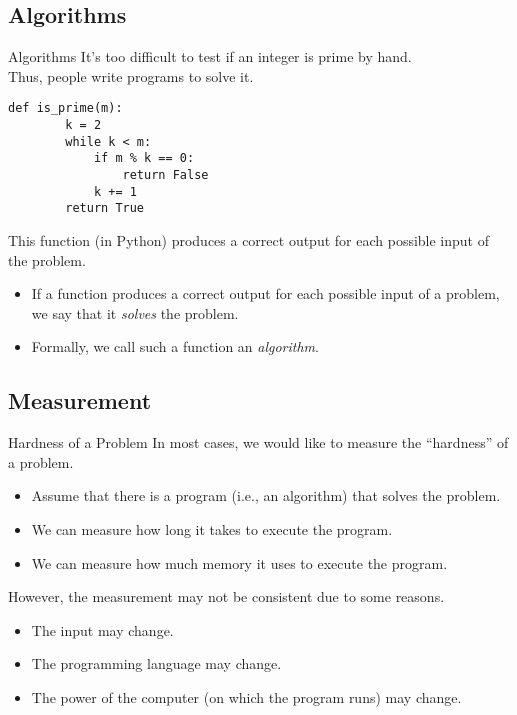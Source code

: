 \documentclass{beamer}
\begin{document}
\subsection{Algorithms}
\begin{frame}[fragile]{Algorithms}
  It's too difficult to test if an integer is prime by hand. \\
  Thus, people write programs to solve it. \pause
  \begin{block}{}
    \scriptsize
    \begin{lstlisting}[gobble=4]
    def is_prime(m):
        k = 2
        while k < m:
            if m % k == 0:
                return False
            k += 1
        return True
    \end{lstlisting}
    \pause
  \end{block}
  This function (in Python) produces a correct output for each possible
  input of the problem. \pause
  \begin{itemize}
    \item If a function produces a correct output for each possible
    input of a problem, we say that it \emph{solves} the problem.
    \item Formally, we call such a function an \emph{algorithm}.
  \end{itemize}
\end{frame}

\subsection{Measurement}
\begin{frame}{Hardness of a Problem}
  In most cases, we would like to measure the ``hardness'' of a problem. \pause
  \begin{itemize}
    \item Assume that there is a program (i.e., an algorithm) that solves the
    problem. \pause
    \item We can measure how long it takes to execute the program. \pause
    \item We can measure how much memory it uses to execute the program. \pause
  \end{itemize}
  However, the measurement may not be consistent due to some reasons. \pause
  \begin{itemize}
    \item The input may change. \pause
    \item The programming language may change. \pause
    \item The power of the computer (on which the program runs) may change.
  \end{itemize}
\end{frame}
\end{document}
